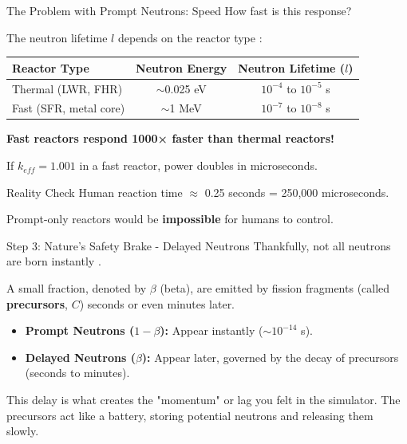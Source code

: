 \documentclass[aspectratio=169]{beamer}
\begin{document}
\begin{frame}[allowframebreaks]{The Problem with Prompt Neutrons: Speed}
    How fast is this response?

    The neutron lifetime $l$ depends on the reactor type \cite{lamarsh2001introduction}:

    \vspace{1em}
    \begin{tabular}{lcc}
        \toprule
        \textbf{Reactor Type} & \textbf{Neutron Energy} & \textbf{Neutron Lifetime ($l$)} \\
        \midrule
        Thermal (LWR, FHR) & $\sim$0.025 eV & $10^{-4}$ to $10^{-5}$ s \\
        Fast (SFR, metal core) & $\sim$1 MeV & $10^{-7}$ to $10^{-8}$ s \\
        \bottomrule
    \end{tabular}

    \vspace{1em}
    \textbf{Fast reactors respond 1000× faster than thermal reactors!}

    \vspace{1em}
    If $k_{eff} = 1.001$ in a fast reactor, power doubles in microseconds.

    \begin{alertblock}{Reality Check}
        Human reaction time $\approx$ 0.25 seconds = 250,000 microseconds.
        
        Prompt-only reactors would be \textbf{impossible} for humans to control.
    \end{alertblock}
\end{frame}

\begin{frame}[allowframebreaks]{Step 3: Nature's Safety Brake - Delayed Neutrons}
    Thankfully, not all neutrons are born instantly \cite{bell1970nuclear}.

    A small fraction, denoted by $\beta$ (beta), are emitted by fission fragments (called \textbf{precursors}, $C$) seconds or even minutes later.

    \begin{itemize}
        \item \textbf{Prompt Neutrons ($1-\beta$):} Appear instantly ($\sim 10^{-14}$ s).
        \item \textbf{Delayed Neutrons ($\beta$):} Appear later, governed by the decay of precursors (seconds to minutes).
    \end{itemize}

    This delay is what creates the "momentum" or lag you felt in the simulator. The precursors act like a battery, storing potential neutrons and releasing them slowly.
\end{frame}
\end{document}
